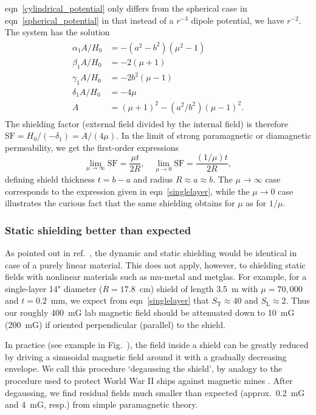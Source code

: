 eqn~\ref{cylindrical_potential} only differs from the spherical case in
eqn~\ref{spherical_potential} in that instead of a $r^{-3}$ dipole potential, we
have $r^{-2}$. The system has the solution
%
\begin{align}
   \label{cyl_coeffs}
   \begin{split}
      \alpha_1A/H_0&=-(a^2-b^2)(\mu^2-1)\\
      \beta_1 A/H_0&=-2(\mu+1)\\
      \gamma_1A/H_0&=-2b^2(\mu-1)\\
      \delta_1A/H_0&=-4\mu\\
      A        &=(\mu+1)^2-(a^2/b^2)(\mu-1)^2.
   \end{split}
\end{align}
%
The shielding factor (external field divided by the internal field) is therefore
$\text{SF}=H_0/(-\delta_1)=A/(4\mu)$. In the limit of strong paramagnetic or
diamagnetic permeability, we get the first-order expressions
%
\[
   \lim_{\mu\to\infty}\text{SF}=\frac{\mu t}{2R}
   ,\quad
   \lim_{\mu\to0}\text{SF}=\frac{(1/\mu)t}{2R},
\]
%
defining shield thickness $t=b-a$ and radius $R\approx a\approx b$. The
$\mu\to\infty$ case corresponds to the expression given in
eqn~\ref{singlelayer}, while the $\mu\to0$ case illustrates the curious fact
that the same shielding obtains for $\mu$ as for $1/\mu$.


\subsubsection{Static shielding better than expected}
\label{better_than_expected}

As pointed out in ref.~\cite{dickerson2012high}, the dynamic and static shielding would
be identical in case of a purely linear material. This does not apply, however,
to shielding static fields with nonlinear materials such as mu-metal and
metglas. For example, for a single-layer 14" diameter ($R=17.8$~cm) shield of
length 3.5~m with $\mu=70,000$ and $t=0.2$~mm, we expect from
eqn~\ref{singlelayer} that $S_\text{T}\approx40$ and $S_\text{L}\approx2$. Thus
our roughly 400~mG lab magnetic field should be attenuated down to 10~mG
(200~mG) if oriented perpendicular (parallel) to the shield.

In practice (see example in Fig.~), the field inside a shield
can be greatly reduced by driving a sinusoidal magnetic field around it with a
gradually decreasing envelope. We call this procedure `degaussing the shield',
by analogy to the procedure used to protect World War II ships against magnetic
mines \cite{hook1941medical}. After degaussing, we find residual fields much
smaller than expected (approx.\ 0.2~mG and 4~mG, resp.) from simple paramagnetic
theory.

